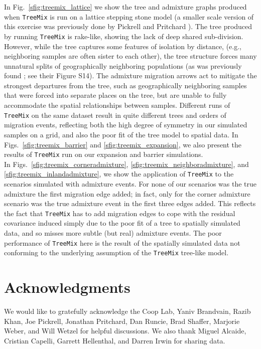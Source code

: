 \documentclass[10pt,letterpaper]{article}
\begin{document}
In Fig.\ \ref{sfig:treemix_lattice} we show the tree and admixture graphs produced when
\texttt{TreeMix} is run on a lattice stepping stone model 
(a smaller scale version of this exercise was previously done by Pickrell and Pritchard \cite{Treemix}). 
The tree produced by running \texttt{TreeMix} is rake-like, showing the lack of deep shared sub-division. 
However, while the tree captures some features of isolation by distance, 
(e.g., neighboring samples are often sister to each other), 
the tree structure forces many unnatural splits of geographically neighboring populations 
(as was previously found \cite{Treemix}; see their Figure S14). 
The admixture migration arrows act to mitigate the strongest departures from the tree, 
such as geographically neighboring samples that were forced into separate places on the tree,
but are unable to fully accommodate the spatial relationships between samples. 
 Different runs of \texttt{TreeMix} on the same dataset result in quite different trees and orders of migration events, 
 reflecting both the high degree of symmetry in our simulated samples on a grid, 
 and also the poor fit of the tree model to spatial data. 
In Figs.\ \ref{sfig:treemix_barrier} and \ref{sfig:treemix_expansion},
we also present the results of \texttt{TreeMix} run on our expansion and barrier simulations.\\

In Figs.\ \ref{sfig:treemix_corneradmixture}, \ref{sfig:treemix_neighboradmixture}, and \ref{sfig:treemix_inlandadmixture},
we show the application of \texttt{TreeMix} to the scenarios simulated with admixture events.  
For none of our scenarios was the true admixture the first migration edge added; 
in fact, only for the corner admixture scenario was the true admixture
event in the first three edges added. 
This reflects the fact that \texttt{TreeMix} has to add migration edges to cope with the residual
covariance induced simply due to the poor fit of a tree to spatially simulated data,
and so misses more subtle (but real) admixture events.
The poor performance of \texttt{TreeMix} here is the result of the 
spatially simulated data not conforming to the 
underlying assumption of the \texttt{TreeMix} tree-like model.

\section*{Acknowledgments}
We would like to gratefully acknowledge the Coop Lab, Yaniv Brandvain, Razib Khan, Joe Pickrell, 
Jonathan Pritchard, Dan Runcie, Brad Shaffer, Marjorie Weber, and Will Wetzel for helpful discussions.  
We also thank Miguel Alcaide, Cristian Capelli, Garrett Hellenthal, and Darren Irwin for sharing data.
\end{document}
